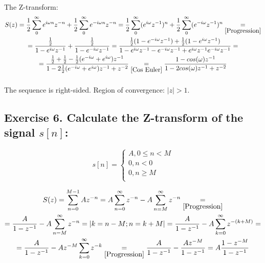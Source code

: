\documentclass[14pt]{article}
\begin{document}
\paragraph{}
The Z-transform:
\begin{multline}
	S(z)
	=
	\frac{1}{2} \sum_0^\infty e^{i \omega n} z^{-n} 
		+ \frac{1}{2} \sum_0^\infty e^{-i \omega n} z^{-n} 
	=
	\frac{1}{2} \sum_0^\infty (e^{i \omega} z^{-1})^n 
		+ \frac{1}{2} \sum_0^\infty (e^{-i \omega} z^{-1})^n 
	\underset{\eqref{Progression}}{=}\\=
	\frac{\frac{1}{2}}{1 - e^{i \omega} z^{-1}} 
		+ \frac{\frac{1}{2}}{1 - e^{-i \omega} z^{-1}}
	=
	\frac{\frac{1}{2} (1 - e^{-i \omega} z^{-1})
		+ \frac{1}{2} (1 - e^{i \omega} z^{-1})}{1 - e^{i \omega}
		z^{-1} - e^{-i \omega} z^{-1} + e^{i \omega} z^{-1} 
		e^{-i \omega} z^{-1}}
	=\\=
	\frac{\frac{1}{2} + \frac{1}{2} - \frac{1}{2}(e^{-i \omega} 
	+ e^{i \omega}) z^{-1}}{1 - 2 \frac{1}{2}(e^{-i \omega} 
	+ e^{i \omega}) z^{-1} + z^{-2}}
	\underset{\eqref{Cos Euler}}{=}
	\frac{1 - cos(\omega) z^{-1}}{1 - 2 cos(\omega) z^{-1} + z^{-2}}
\end{multline}

\paragraph{}
The sequence is right-sided. Region of convergence: $ |z| > 1 $.

\subsection{Exercise 6. Calculate the Z-transform of the signal 
	$ s[n] $:}
\begin{equation}
	s[n]
	=
	\left\{  
	\begin{array}{rcl}  
		A, 0 \leq n < M\\  
		0, n < 0\\    
		0, n \geq M\\  
	\end{array}
	\right.
\end{equation}

\begin{multline}
	S(z)
	=
	\sum_{n = 0}^{M - 1} A z^{-n} 
	=
	A \sum_{n = 0}^{\infty} z^{-n} - A \sum_{n = M}^{\infty} z^{-n}
	\underset{\eqref{Progression}}{=}\\=
	\frac{A}{1 - z^{-1}} - A \sum_{n = M}^{\infty} z^{-n}
	=
	|k = n-M;n = k+M|
	=
	\frac{A}{1 - z^{-1}} - A \sum_{k = 0}^{\infty} z^{-(k + M)}
	=\\=
	\frac{A}{1 - z^{-1}} - A z^{-M} \sum_{k = 0}^{\infty} z^{-k}
	\underset{\eqref{Progression}}{=}
	\frac{A}{1 - z^{-1}} - \frac{A z^{-M}}{1 - z^{-1}}
	=
	A \frac{1 - z^{-M}}{1 - z^{-1}}
\end{multline}
\end{document}
